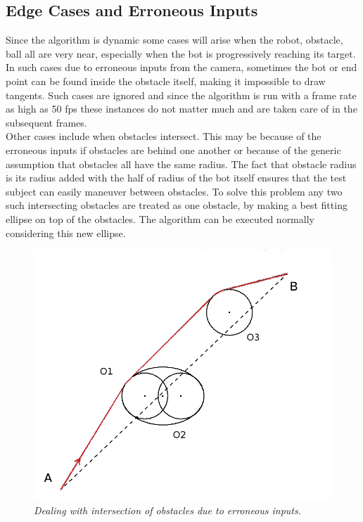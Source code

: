 \documentclass[letterpaper, 10 pt, conference]{ieeeconf}  %
\begin{document}
\subsection{Edge Cases and Erroneous Inputs}
Since the algorithm is dynamic some cases will arise when the robot, obstacle, ball all are very near, especially when the bot is progressively reaching its target.
In such cases due to erroneous inputs from the camera, sometimes the bot or end point can be found inside the obstacle itself, making it impossible to draw tangents. Such cases are ignored and since the algorithm is run with a frame rate as high as 50 fps these instances do not matter much and are taken care of in the subsequent frames.
\\ 
Other cases include when obstacles intersect. This may be because of the erroneous inputs if obstacles are behind one another or because of the generic assumption that obstacles all have the same radius. The fact that obstacle radius is its radius added with the half of radius of the bot itself ensures that the test subject can easily maneuver between obstacles. To solve this problem any two such intersecting obstacles are treated as one obstacle, by making a best fitting ellipse on top of the obstacles. The algorithm can be executed normally considering this new ellipse.

\begin{figure}[t]  
\begin{center}  
\includegraphics[scale=0.25]{intersection1.JPG}  
\caption{\small \sl Dealing with intersection of obstacles due to erroneous inputs.\label{fig: intersection}}  
\end{center}  
\end{figure}
\end{document}
